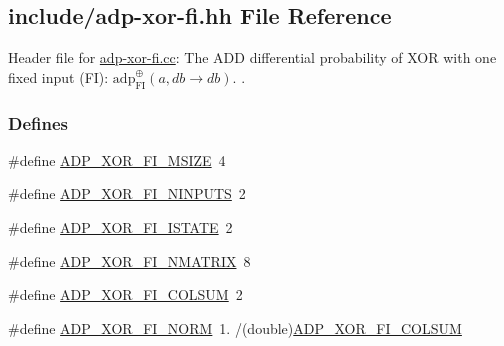 \hypertarget{adp-xor-fi_8hh}{\subsection{include/adp-\/xor-\/fi.hh \-File \-Reference}
\label{adp-xor-fi_8hh}
}


\-Header file for \hyperlink{adp-xor-fi_8cc}{adp-\/xor-\/fi.\-cc}\-: \-The \-A\-D\-D differential probability of \-X\-O\-R with one fixed input (\-F\-I)\-: $\mathrm{adp}^{\oplus}_{\mathrm{FI}}(a,db \rightarrow db)$. .  


\subsubsection*{\-Defines}
\begin{DoxyCompactItemize}
\item 
\#define \hyperlink{adp-xor-fi_8hh_aad1f778b56ab0098ef71c0bd7408395b}{\-A\-D\-P\-\_\-\-X\-O\-R\-\_\-\-F\-I\-\_\-\-M\-S\-I\-Z\-E}~4
\item 
\#define \hyperlink{adp-xor-fi_8hh_a465199ed59ad0070f9a313acd2198cda}{\-A\-D\-P\-\_\-\-X\-O\-R\-\_\-\-F\-I\-\_\-\-N\-I\-N\-P\-U\-T\-S}~2
\item 
\#define \hyperlink{adp-xor-fi_8hh_a3da1861fee62725d5f9a6cb9fd0eb0b0}{\-A\-D\-P\-\_\-\-X\-O\-R\-\_\-\-F\-I\-\_\-\-I\-S\-T\-A\-T\-E}~2
\item 
\#define \hyperlink{adp-xor-fi_8hh_abe41c3d866c1e7395652b8cf4b3365f0}{\-A\-D\-P\-\_\-\-X\-O\-R\-\_\-\-F\-I\-\_\-\-N\-M\-A\-T\-R\-I\-X}~8
\item 
\#define \hyperlink{adp-xor-fi_8hh_a029a46ca45daac1bf0c9c00e3d98c5d2}{\-A\-D\-P\-\_\-\-X\-O\-R\-\_\-\-F\-I\-\_\-\-C\-O\-L\-S\-U\-M}~2
\item 
\#define \hyperlink{adp-xor-fi_8hh_aa4a02a0aefd500c993c231abec9d68f6}{\-A\-D\-P\-\_\-\-X\-O\-R\-\_\-\-F\-I\-\_\-\-N\-O\-R\-M}~1. /(double)\hyperlink{adp-xor-fi_8hh_a029a46ca45daac1bf0c9c00e3d98c5d2}{\-A\-D\-P\-\_\-\-X\-O\-R\-\_\-\-F\-I\-\_\-\-C\-O\-L\-S\-U\-M}
\end{DoxyCompactItemize}

